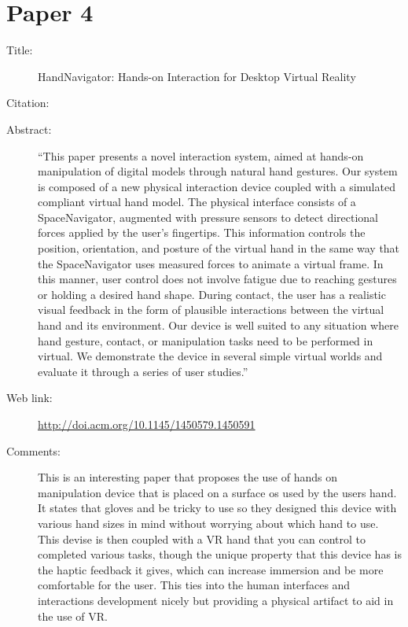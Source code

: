 \documentclass{scrartcl}
\begin{document}
	\section*{Paper 4}
	\begin{description}
		\item[Title:] HandNavigator: Hands-on Interaction for Desktop Virtual Reality
		\item[Citation:] \cite{Kry}
		\item[Abstract:] ``This paper presents a novel interaction system, aimed at hands-on manipulation of digital models through natural hand gestures. Our system is composed of a new physical interaction device coupled with a simulated compliant virtual hand model. The physical interface consists of a SpaceNavigator, augmented with pressure sensors to detect directional forces applied by the user's fingertips. This information controls the position, orientation, and posture of the virtual hand in the same way that the SpaceNavigator uses measured forces to animate a virtual frame. In this manner, user control does not involve fatigue due to reaching gestures or holding a desired hand shape. During contact, the user has a realistic visual feedback in the form of plausible interactions between the virtual hand and its environment. Our device is well suited to any situation where hand gesture, contact, or manipulation tasks need to be performed in virtual. We demonstrate the device in several simple virtual worlds and evaluate it through a series of user studies.''
		\item[Web link:] \url{http://doi.acm.org/10.1145/1450579.1450591}
		\item[Comments:]This is an interesting paper that proposes the use of hands on manipulation device that is placed on a surface os used by the users hand. It states that gloves and be tricky to use so they designed this device with various hand sizes in mind without worrying about which hand to use. This devise is then coupled with a VR hand that you can control to completed various tasks, though the unique property that this device has is the haptic feedback it gives, which can increase immersion and be more comfortable for the user. This ties into the human interfaces and interactions development nicely but providing a physical artifact to aid in the use of VR.
	\end{description}
	
\end{document}
